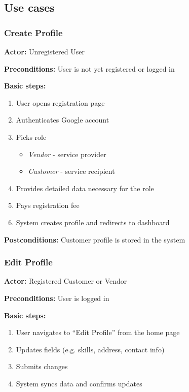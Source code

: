 \documentclass[11pt,a4paper]{article}
\begin{document}
\subsection{Use cases}

\subsubsection{Create Profile}

\textbf{Actor:} Unregistered User

\noindent \textbf{Preconditions:} User is not yet registered or logged in

\noindent \textbf{Basic steps:}
\begin{enumerate}[noitemsep]
  \item User opens registration page
  \item Authenticates Google account
  \item Picks role
    \begin{itemize}[noitemsep]
      \item \textit{Vendor} - service provider
      \item \textit{Customer} - service recipient
    \end{itemize}
  \item Provides detailed data necessary for the role
  \item Pays registration fee
  \item System creates profile and redirects to dashboard
\end{enumerate}

\noindent \textbf{Postconditions:} Customer profile is stored in the system

\subsubsection{Edit Profile}

\textbf{Actor:} Registered Customer or Vendor

\noindent \textbf{Preconditions:} User is logged in

\noindent \textbf{Basic steps:}
\begin{enumerate}
  \item User navigates to ``Edit Profile'' from the home page
  \item Updates fields (e.g. skills, address, contact info)
  \item Submits changes
  \item System syncs data and confirms updates
\end{enumerate}
\end{document}

